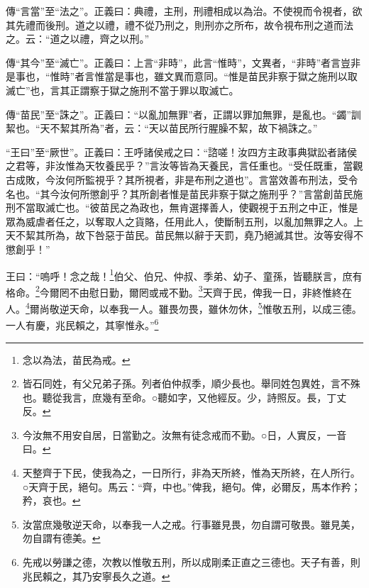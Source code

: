 {\noindent\zhuan{}\fzbyks 傳“言當”至“法之”。正義曰：典禮，主刑，刑禮相成以為治。不使視而令視者，欲其先禮而後刑。道之以禮，禮不從乃刑之，則刑亦之所布，故令視布刑之道而法之。云：“道之以禮，齊之以刑。” \par}

{\noindent\zhuan{}\fzbyks 傳“其今”至“滅亡”。正義曰：上言“非時”，此言“惟時”，文異者，“非時”者言豈非是事也，“惟時”者言惟當是事也，雖文異而意同。“惟是苗民非察于獄之施刑以取滅亡”也，言其正謂察于獄之施刑不當于罪以取滅亡。 \par}

{\noindent\zhuan{}\fzbyks 傳“苗民”至“誅之”。正義曰：“以亂加無罪”者，正謂以罪加無罪，是亂也。“蠲”訓絜也。“天不絜其所為”者，云：“天以苗民所行腥臊不絜，故下禍誅之。” \par}

{\noindent\shu{}\fzkt “王曰”至“厥世”。正義曰：王呼諸侯戒之曰：“諮嗟！汝四方主政事典獄訟者諸侯之君等，非汝惟為天牧養民乎？”言汝等皆為天養民，言任重也。“受任既重，當觀古成敗，今汝何所監視乎？其所視者，非是布刑之道也”。言當效善布刑法，受令名也。“其今汝何所懲創乎？其所創者惟是苗民非察于獄之施刑乎？”言當創苗民施刑不當取滅亡也。“彼苗民之為政也，無肯選擇善人，使觀視于五刑之中正，惟是眾為威虐者任之，以奪取人之貨賂，任用此人，使斷制五刑，以亂加無罪之人。上天不絜其所為，故下咎惡于苗民。苗民無以辭于天罰，堯乃絕滅其世。汝等安得不懲創乎！” \par}

王曰：“嗚呼！念之哉！\footnote{念以為法，苗民為戒。}伯父、伯兄、仲叔、季弟、幼子、童孫，皆聽朕言，庶有格命。\footnote{皆石同姓，有父兄弟子孫。列者伯仲叔季，順少長也。舉同姓包異姓，言不殊也。聽從我言，庶幾有至命。○聽如字，又他經反。少，詩照反。長，丁丈反。}今爾罔不由慰日勤，爾罔或戒不勤。\footnote{今汝無不用安自居，日當勤之。汝無有徒念戒而不勤。○日，人實反，一音曰。}天齊于民，俾我一日，非終惟終在人。\footnote{天整齊于下民，使我為之，一日所行，非為天所終，惟為天所終，在人所行。○天齊于民，絕句。馬云：“齊，中也。”俾我，絕句。俾，必爾反，馬本作矜；矜，哀也。}爾尚敬逆天命，以奉我一人。雖畏勿畏，雖休勿休，\footnote{汝當庶幾敬逆天命，以奉我一人之戒。行事雖見畏，勿自謂可敬畏。雖見美，勿自謂有德美。}惟敬五刑，以成三德。一人有慶，兆民賴之，其寧惟永。”\footnote{先戒以勞謙之德，次教以惟敬五刑，所以成剛柔正直之三德也。天子有善，則兆民賴之，其乃安寧長久之道。}


